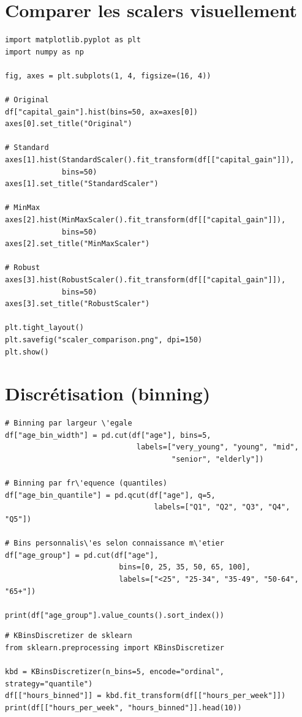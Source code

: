 \section{Comparer les scalers visuellement}

\begin{verbatim}
import matplotlib.pyplot as plt
import numpy as np

fig, axes = plt.subplots(1, 4, figsize=(16, 4))

# Original
df["capital_gain"].hist(bins=50, ax=axes[0])
axes[0].set_title("Original")

# Standard
axes[1].hist(StandardScaler().fit_transform(df[["capital_gain"]]),
             bins=50)
axes[1].set_title("StandardScaler")

# MinMax
axes[2].hist(MinMaxScaler().fit_transform(df[["capital_gain"]]),
             bins=50)
axes[2].set_title("MinMaxScaler")

# Robust
axes[3].hist(RobustScaler().fit_transform(df[["capital_gain"]]),
             bins=50)
axes[3].set_title("RobustScaler")

plt.tight_layout()
plt.savefig("scaler_comparison.png", dpi=150)
plt.show()
\end{verbatim}

\section{Discr\'etisation (binning)}

\begin{verbatim}
# Binning par largeur \'egale
df["age_bin_width"] = pd.cut(df["age"], bins=5,
                              labels=["very_young", "young", "mid",
                                      "senior", "elderly"])

# Binning par fr\'equence (quantiles)
df["age_bin_quantile"] = pd.qcut(df["age"], q=5,
                                  labels=["Q1", "Q2", "Q3", "Q4", "Q5"])

# Bins personnalis\'es selon connaissance m\'etier
df["age_group"] = pd.cut(df["age"],
                          bins=[0, 25, 35, 50, 65, 100],
                          labels=["<25", "25-34", "35-49", "50-64", "65+"])

print(df["age_group"].value_counts().sort_index())
\end{verbatim}

\begin{verbatim}
# KBinsDiscretizer de sklearn
from sklearn.preprocessing import KBinsDiscretizer

kbd = KBinsDiscretizer(n_bins=5, encode="ordinal", strategy="quantile")
df[["hours_binned"]] = kbd.fit_transform(df[["hours_per_week"]])
print(df[["hours_per_week", "hours_binned"]].head(10))
\end{verbatim}

